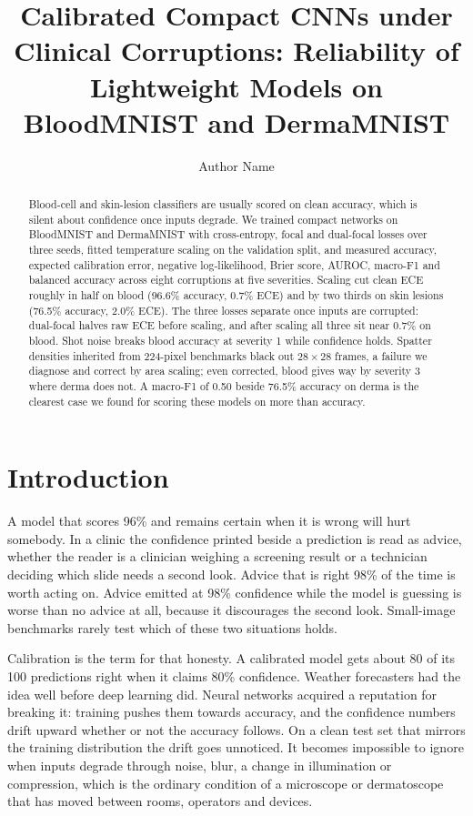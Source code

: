 \documentclass[a4paper,11pt,en,citestyle=authoryear,bibstyle=authoryear]{elegantpaper}
\title{Calibrated Compact CNNs under Clinical Corruptions: Reliability of Lightweight Models on BloodMNIST and DermaMNIST}
\author{Author Name}
\institute{University Name}
\date{}
\begin{document}
\maketitle

\begin{abstract}
Blood-cell and skin-lesion classifiers are usually scored on clean accuracy, which is silent about confidence once inputs degrade. We trained compact networks on BloodMNIST and DermaMNIST with cross-entropy, focal and dual-focal losses over three seeds, fitted temperature scaling on the validation split, and measured accuracy, expected calibration error, negative log-likelihood, Brier score, AUROC, macro-F1 and balanced accuracy across eight corruptions at five severities. Scaling cut clean ECE roughly in half on blood (96.6\% accuracy, 0.7\% ECE) and by two thirds on skin lesions (76.5\% accuracy, 2.0\% ECE). The three losses separate once inputs are corrupted: dual-focal halves raw ECE before scaling, and after scaling all three sit near 0.7\% on blood. Shot noise breaks blood accuracy at severity 1 while confidence holds. Spatter densities inherited from 224-pixel benchmarks black out $28\times28$ frames, a failure we diagnose and correct by area scaling; even corrected, blood gives way by severity 3 where derma does not. A macro-F1 of 0.50 beside 76.5\% accuracy on derma is the clearest case we found for scoring these models on more than accuracy.
\end{abstract}

\section{Introduction}
A model that scores 96\% and remains certain when it is wrong will hurt somebody. In a clinic the confidence printed beside a prediction is read as advice, whether the reader is a clinician weighing a screening result or a technician deciding which slide needs a second look. Advice that is right 98\% of the time is worth acting on. Advice emitted at 98\% confidence while the model is guessing is worse than no advice at all, because it discourages the second look. Small-image benchmarks rarely test which of these two situations holds.

Calibration is the term for that honesty. A calibrated model gets about 80 of its 100 predictions right when it claims 80\% confidence. Weather forecasters had the idea well before deep learning did. Neural networks acquired a reputation for breaking it: training pushes them towards accuracy, and the confidence numbers drift upward whether or not the accuracy follows. On a clean test set that mirrors the training distribution the drift goes unnoticed. It becomes impossible to ignore when inputs degrade through noise, blur, a change in illumination or compression, which is the ordinary condition of a microscope or dermatoscope that has moved between rooms, operators and devices.
\end{document}
